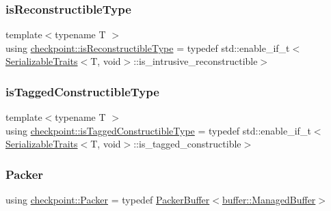 \mbox{\label{namespacecheckpoint_a126da7cae6bbbec231bb2552dc3ad6cc}} 
\subsubsection{\texorpdfstring{is\+Reconstructible\+Type}{isReconstructibleType}}
{\footnotesize\ttfamily template$<$typename T $>$ \\
using \hyperlink{namespacecheckpoint_a126da7cae6bbbec231bb2552dc3ad6cc}{checkpoint\+::is\+Reconstructible\+Type} = typedef std\+::enable\+\_\+if\+\_\+t$<$\hyperlink{structcheckpoint_1_1_serializable_traits}{Serializable\+Traits}$<$T, void$>$\+::is\+\_\+intrusive\+\_\+reconstructible$>$}

\mbox{\label{namespacecheckpoint_abff0f367c546c94ce857d200153d990f}} 
\subsubsection{\texorpdfstring{is\+Tagged\+Constructible\+Type}{isTaggedConstructibleType}}
{\footnotesize\ttfamily template$<$typename T $>$ \\
using \hyperlink{namespacecheckpoint_abff0f367c546c94ce857d200153d990f}{checkpoint\+::is\+Tagged\+Constructible\+Type} = typedef std\+::enable\+\_\+if\+\_\+t$<$\hyperlink{structcheckpoint_1_1_serializable_traits}{Serializable\+Traits}$<$T, void$>$\+::is\+\_\+tagged\+\_\+constructible$>$}

\mbox{\label{namespacecheckpoint_ad744c208c7b1da6ee19c10d071e74f7d}} 
\subsubsection{\texorpdfstring{Packer}{Packer}}
{\footnotesize\ttfamily using \hyperlink{namespacecheckpoint_ad744c208c7b1da6ee19c10d071e74f7d}{checkpoint\+::\+Packer} = typedef \hyperlink{structcheckpoint_1_1_packer_buffer}{Packer\+Buffer}$<$\hyperlink{structcheckpoint_1_1buffer_1_1_managed_buffer}{buffer\+::\+Managed\+Buffer}$>$}

